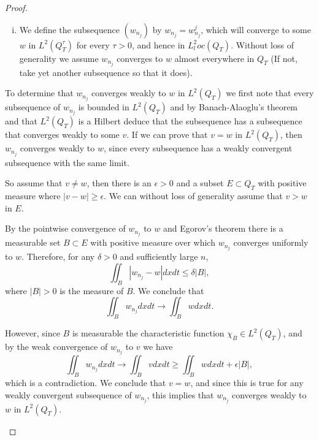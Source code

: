 \documentclass[11pt, a4paper]{article}
\begin{document}
\begin{proof}
\begin{description}
\begin{enumerate}[i)]
	\item We define the subsequence $(w_{n_j})$ by $w_{n_j} = w_{n_j}^j$, which will converge to some $w$ in $L^2(Q_T^\tau)$ for every $\tau > 0$, and hence in $L^2_loc(Q_T)$. Without loss of generality we assume $w_{n_j}$ converges to $w$ almost everywhere in $Q_T$ (If not, take yet another subsequence so that it does).
\end{enumerate}	 

	To determine that $w_{n_j}$ converges weakly to $w$ in $L^2(Q_T)$ we first note that every subsequence of $w_{n_j}$ is bounded in $L^2(Q_T)$ and by Banach-Alaoglu's theorem and that $L^2(Q_T)$ is a Hilbert deduce that the subsequence has a subsequence that converges weakly to some $v$. If we can prove that $v=w$ in $L^2(Q_T)$, then $w_{n_j}$ converges weakly to $w$, since every subsequence has a weakly convergent subsequence with the same limit.
	
	So assume that $v\neq w$, then there is an $\epsilon > 0$ and a subset $E\subset Q_T$ with positive measure where $|v-w| \geq \epsilon$. We can without loss of generality assume that $v > w$ in $E$.
	
	By the pointwise convergence of $w_{n_j}$ to $w$ and Egorov's theorem \citep[p. 120]{weiss1999course}	
	there is a measurable set $B\subset E$ with positive measure over which $w_{n_j}$ converges uniformly to $w$. Therefore, for any $\delta > 0$ and sufficiently large $n$,
	\begin{equation*}
	\iint_B |w_{n_j}-w|dxdt \leq \delta |B|,
	\end{equation*}
	where $|B|>0$ is the measure of $B$. We conclude that
	\begin{equation*}
	\iint_B w_{n_j}dxdt \to \iint_B wdxdt.
	\end{equation*}
	
	However, since $B$ is measurable the characteristic function $\chi_B \in L^2(Q_T)$, and by the weak convergence of $w_{n_j}$ to $v$ we have
	\begin{equation*}
	\iint_B w_{n_j}dxdt \to \iint_B vdxdt \geq \iint_B wdxdt + \epsilon|B|,
	\end{equation*}
	which is a contradiction. We conclude that $v=w$, and since this is true for any weakly convergent subsequence of $w_{n_j}$, this implies that $w_{n_j}$ converges weakly to $w$ in $L^2(Q_T)$.
	

\end{description}
\end{proof}
\end{document}
